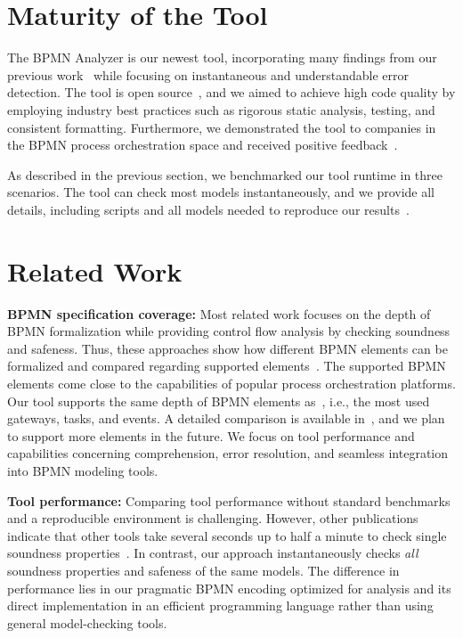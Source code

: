\documentclass[
onecolumn, %
]{ceurart}
\begin{document}
\section{Maturity of the Tool} \label{sec:maturity}
The BPMN Analyzer is our newest tool, incorporating many findings from our previous work~\cite{krauterHigherorderTransformationApproach2024} while focusing on instantaneous and understandable error detection.
The tool is open source~\cite{krauterInstantaneousComprehensibleFixable2024}, and we aimed to achieve high code quality by employing industry best practices such as rigorous static analysis, testing, and consistent formatting.
Furthermore, we demonstrated the tool to companies in the BPMN process orchestration space and received positive feedback~\cite{krauterInstantaneousComprehensibleFixable2024}.

As described in the previous section, we benchmarked our tool runtime in three scenarios.
The tool can check most models instantaneously, and we provide all details, including scripts and all models needed to reproduce our results~\cite{krauterInstantaneousComprehensibleFixable2024}.

\section{Related Work} \label{sec:related-work}

\textbf{BPMN specification coverage:}
Most related work focuses on the depth of BPMN formalization while providing control flow analysis by checking soundness and safeness.
Thus, these approaches show how different BPMN elements can be formalized and compared regarding supported elements~\cite{krauterHigherorderTransformationApproach2024,corradiniFormalApproachAnalysis2021,houhouFirstOrderLogicVerification2022}.
The supported BPMN elements come close to the capabilities of popular process orchestration platforms.
Our tool supports the same depth of BPMN elements as~\cite{corradiniFormalApproachAnalysis2021}, i.e., the most used gateways, tasks, and events.
A detailed comparison is available in~\cite{krauterInstantaneousComprehensibleFixable2024}, and we plan to support more elements in the future.
We focus on tool performance and capabilities concerning comprehension, error resolution, and seamless integration into BPMN modeling tools.

\textbf{Tool performance:}
Comparing tool performance without standard benchmarks and a reproducible environment is challenging.
However, other publications indicate that other tools take several seconds up to half a minute to check single soundness properties~\cite{krauterHigherorderTransformationApproach2024,corradiniFormalApproachAnalysis2021,houhouFirstOrderLogicVerification2022}.
In contrast, our approach instantaneously checks \textit{all} soundness properties and safeness of the same models.
The difference in performance lies in our pragmatic BPMN encoding optimized for analysis and its direct implementation in an efficient programming language rather than using general model-checking tools.
\end{document}
